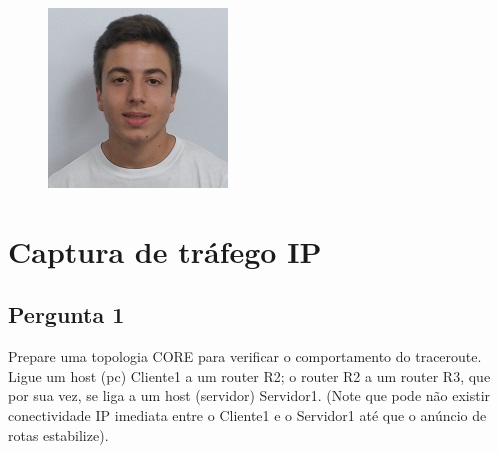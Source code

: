 \documentclass[11pt]{article}
\begin{document}
\begin{titlepage}
\begin{center}
\begin{figure}[hbt!]
            \centering
            \captionsetup{A89585}
        \endminipage\hfill
            \includegraphics[width=\linewidth]{images/capa/80.jpeg}
            \centering
            \captionsetup{A89597}
        \endminipage
        \end{figure}
    \end{center}
\end{titlepage}

\tableofcontents
\thispagestyle{empty}
\cleardoublepage

\setcounter{page}{1}




\section{Captura de tráfego IP}

\vspace{0.5cm}

\subsection{Pergunta 1}

Prepare uma topologia CORE para verificar o comportamento do
traceroute. Ligue um host (pc) Cliente1 a um router R2; o router
R2 a um router R3, que por sua vez, se liga a um host (servidor)
Servidor1. (Note que pode não existir conectividade IP imediata
entre o Cliente1 e o Servidor1 até que o anúncio de rotas
estabilize).
\end{document}
